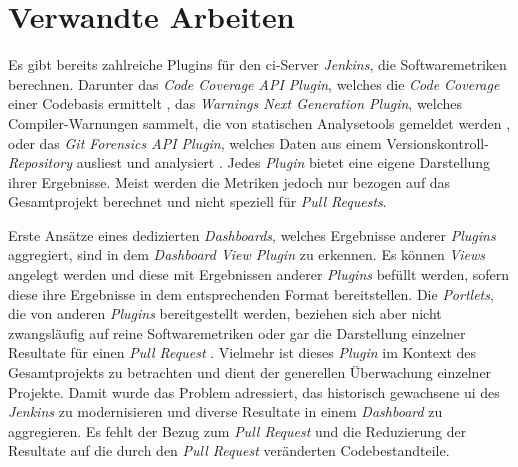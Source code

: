 \chapter{Verwandte Arbeiten}
\label{chap:verwandte-arbeiten}

Es gibt bereits zahlreiche Plugins für den \ac{ci}-Server \textit{Jenkins}, die Softwaremetriken berechnen. Darunter das \textit{Code Coverage API Plugin}, welches die \textit{Code Coverage} einer Codebasis ermittelt \citep{code-coverage-api-plugin}, das \textit{Warnings Next Generation Plugin}, welches Compiler-Warnungen sammelt, die von statischen Analysetools gemeldet werden \citep{warnings-ng-plugin}, oder das \textit{Git Forensics API Plugin}, welches Daten aus einem Versionskontroll-\textit{Repository} ausliest und analysiert \citep{forensics-api-plugin}. 
Jedes \textit{Plugin} bietet eine eigene Darstellung ihrer Ergebnisse. Meist werden die Metriken jedoch nur bezogen auf das Gesamtprojekt berechnet und nicht speziell für \textit{Pull Requests}. 

Erste Ansätze eines dedizierten \textit{Dashboards}, welches Ergebnisse anderer \textit{Plugins} aggregiert, sind in dem \textit{Dashboard View Plugin} zu erkennen. Es können \textit{Views} angelegt werden und diese mit Ergebnissen anderer \textit{Plugins} befüllt werden, sofern diese ihre Ergebnisse in dem entsprechenden Format bereitstellen. Die \textit{Portlets}, die von anderen \textit{Plugins} bereitgestellt werden, beziehen sich aber nicht zwangsläufig auf reine Softwaremetriken oder gar die Darstellung einzelner Resultate für einen \textit{Pull Request} \citep{dashboard-view-plugin}. Vielmehr ist dieses \textit{Plugin} im Kontext des Gesamtprojekts zu betrachten und dient der generellen Überwachung einzelner Projekte. Damit wurde das Problem adressiert, das historisch gewachsene \ac{ui} des \textit{Jenkins} zu modernisieren und diverse Resultate in einem \textit{Dashboard} zu aggregieren. Es fehlt der Bezug  zum \textit{Pull Request} und die Reduzierung der Resultate auf die durch den \textit{Pull Request} veränderten Codebestandteile. 